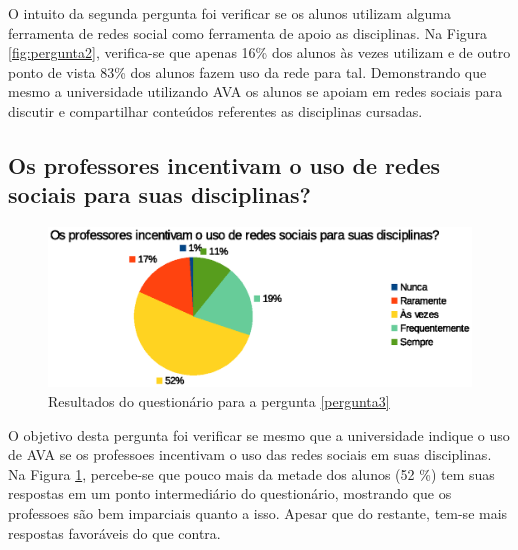 O intuito da segunda pergunta foi verificar se os alunos utilizam alguma ferramenta de redes social como ferramenta de apoio as disciplinas. Na Figura \ref{fig:pergunta2}, verifica-se que apenas 16\% dos alunos às vezes utilizam e de outro ponto de vista 83\% dos alunos fazem uso da rede para tal. Demonstrando que mesmo a universidade utilizando AVA os alunos se apoiam em redes sociais para discutir e compartilhar conteúdos referentes as disciplinas cursadas.

\subsection*{Os professores incentivam o uso de redes sociais para suas disciplinas?}
\begin{figure}[h]
    \centering
    \includegraphics[keepaspectratio=true,scale=1]
      {figuras/pergunta3p.eps}
    \caption{Resultados do questionário para a pergunta \ref{pergunta3}}
    \label{fig:pergunta3}
\end{figure}

O objetivo desta pergunta foi verificar se mesmo que a universidade indique o uso de AVA se os professoes incentivam o uso das redes sociais em suas disciplinas. Na Figura \ref{fig:pergunta3}, percebe-se que pouco mais da metade dos alunos (52 \%) tem suas respostas em um ponto intermediário do questionário, mostrando que os professoes são bem imparciais quanto a isso. Apesar que do restante, tem-se mais respostas favoráveis do que contra.

